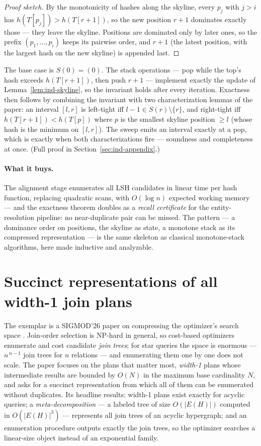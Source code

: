 \begin{proof}[Proof sketch]
By the monotonicity of hashes along the skyline, every $p_j$ with $j > i$ has
$h(T[p_j]) > h(T[r+1])$, so the new position $r+1$ dominates exactly those --- they
leave the skyline. Positions are dominated only by later ones, so the prefix
$(p_1,\dots,p_i)$ keeps its pairwise order, and $r+1$ (the latest position, with the
largest hash on the new skyline) is appended last.
\end{proof}

The base case is $S(0) = (0)$. The stack operations --- pop while the top's hash
exceeds $h(T[r+1])$, then push $r+1$ --- implement exactly the update of
Lemma~\ref{lem:ind-skyline}, so the invariant holds after every iteration. Exactness
then follows by combining the invariant with two characterization lemmas of the paper:
an interval $[l,r]$ is left-tight iff $l-1 \in S(r) \setminus \{r\}$, and right-tight
iff $h(T[r+1]) < h(T[p])$ where $p$ is the smallest skyline position $\ge l$ (whose
hash is the minimum on $[l,r]$). The sweep emits an interval exactly at a pop, which
is exactly when both characterizations fire --- soundness and completeness at once.
(Full proof in Section~\ref{sec:ind-appendix}.)

\paragraph{What it buys.}
The alignment stage enumerates all LSH candidates in linear time per hash function,
replacing quadratic scans, with $O(\log n)$ expected working memory --- and the
exactness theorem doubles as a \emph{recall certificate} for the entity-resolution
pipeline: no near-duplicate pair can be missed. The pattern --- a dominance order on
positions, the skyline as state, a monotone stack as its compressed representation ---
is the same skeleton as classical monotone-stack algorithms, here made inductive and
analyzable.

\section{Succinct representations of all width-1 join plans}
\label{sec:ind-succinct}

The exemplar is a SIGMOD'26 paper on compressing the optimizer's search space
\citep{sigmod26-233}. Join-order selection is NP-hard in general, so cost-based
optimizers enumerate and cost candidate \emph{join trees}; for star queries the space
is enormous --- $n^{\,n-1}$ join trees for $n$ relations --- and enumerating them one
by one does not scale. The paper focuses on the plans that matter most,
\emph{width-1} plans whose intermediate results are bounded by $O(N)$ in the maximum
base cardinality $N$, and asks for a succinct representation from which all of them
can be enumerated without duplicates. Its headline results: width-1 plans exist
exactly for acyclic queries; a \emph{meta-decomposition} --- a labeled tree of size
$O(|E(H)|)$ computed in $O(|E(H)|^{3})$ --- represents all join trees of an acyclic
hypergraph; and an enumeration procedure outputs exactly the join trees, so the
optimizer searches a linear-size object instead of an exponential family.

